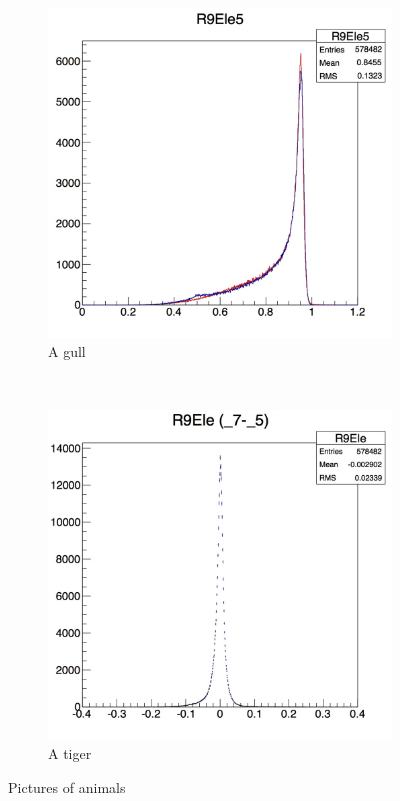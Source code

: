 \documentclass[10pt]{article}
\begin{document}
\begin{figure}[h!]
        \centering
        \begin{subfigure}[b]{0.4\textwidth}
                \includegraphics[width=\textwidth]{Plots/R9dist}
                \caption{A gull}
                \label{fig:gull}
        \end{subfigure}%
        ~ %
        \begin{subfigure}[b]{0.4\textwidth}
                \includegraphics[width=\textwidth]{Plots/R9}
                \caption{A tiger}
                \label{fig:tiger}
        \end{subfigure}
       
        \caption{Pictures of animals}\label{fig:animals}
\end{figure}
\end{document}
